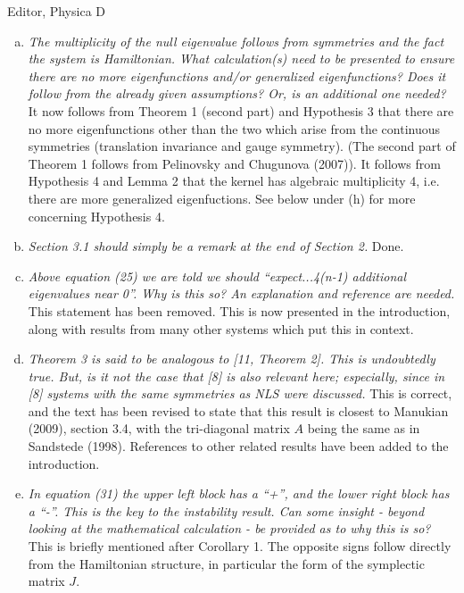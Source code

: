 \documentclass[11pt]{letter}
\begin{document}
\begin{letter}{Editor, Physica D}
\begin{enumerate}[(a)]
\item \emph{The multiplicity of the null eigenvalue follows from symmetries and the fact the system is Hamiltonian. What calculation(s) need to be presented to ensure there are no more eigenfunctions and/or generalized eigenfunctions? Does it follow from the already given assumptions? Or, is an additional one needed?} It now follows from Theorem 1 (second part) and Hypothesis 3 that there are no more eigenfunctions other than the two which arise from the continuous symmetries (translation invariance and gauge symmetry). (The second part of Theorem 1 follows from Pelinovsky and Chugunova (2007)). It follows from Hypothesis 4 and Lemma 2 that the kernel has algebraic multiplicity 4, i.e. there are more generalized eigenfuctions. See below under (h) for more concerning Hypothesis 4.
\vspace{4mm}

\item \emph{Section 3.1 should simply be a remark at the end of Section 2.} Done.
\vspace{4mm}

\item \emph{Above equation (25) we are told we should ``expect...4(n-1) additional eigenvalues  near 0''. Why is this so? An explanation and reference are needed.} This statement has been removed. This is now presented in the introduction, along with results from many other systems which put this in context.
\vspace{4mm}

\item \emph{Theorem 3 is said to be analogous to [11, Theorem 2]. This is undoubtedly true. But, is it not the case that [8] is also relevant here; especially, since in [8] systems with the same symmetries as NLS were discussed.} This is correct, and the text has been revised to state that this result is closest to Manukian (2009), section 3.4, with the tri-diagonal matrix $A$ being the same as in Sandstede (1998). References to other related results have been added to the introduction.
\vspace{4mm}

\item \emph{In equation (31) the upper left block has a ``+'', and the lower right block has a ``-''. This is the key to the instability result. Can some insight - beyond looking at the mathematical calculation - be provided as to why this is so?} This is briefly mentioned after Corollary 1. The opposite signs follow directly from the Hamiltonian structure, in particular the form of the symplectic matrix $J$.
\vspace{4mm}


\end{enumerate}
\end{letter}
\end{document}
